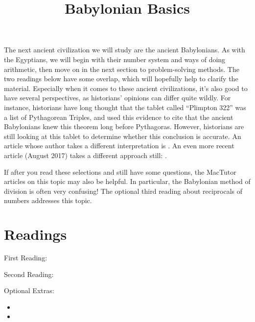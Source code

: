 \documentclass{ximera}
\title{Babylonian Basics}
\begin{document}
\begin{abstract}
\end{abstract}
\maketitle

The next ancient civilization we will study are the ancient Babylonians.  As with the Egyptians, we will begin with their number system and ways of doing arithmetic, then move on in the next section to problem-solving methods.  The two readings below have some overlap, which will hopefully help to clarify the material.  Especially when it comes to these ancient civilizations, it's also good to have several perspectives, as historians' opinions can differ quite wildly.  For instance, historians have long thought that the tablet called ``Plimpton 322'' was a list of Pythagorean Triples, and used this evidence to cite that the ancient Babylonians knew this theorem long before Pythagoras.  However, historians are still looking at this tablet to determine whether this conclusion is accurate.  An article whose author takes a different interpretation is .  An even more recent article (August 2017) takes a different approach still: .

If after you read these selections and still have some questions, the MacTutor articles on this topic may also be helpful.  In particular, the Babylonian method of division is often very confusing!  The optional third reading about reciprocals of numbers addresses this topic.



\section{Readings}

First Reading:  

Second Reading: 

Optional Extras: 
\begin{itemize}
\item {}
\item {}
\end{itemize}
\end{document}
